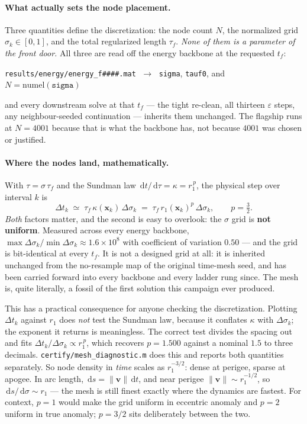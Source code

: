 \documentclass[11pt]{article}
\newcommand{\ud}{\,\mathrm{d}}
\newcommand{\vect}[1]{\bm{#1}}
\newcommand{\file}[1]{\texttt{#1}}
\begin{document}
\paragraph{What actually sets the node placement.} Three quantities define the
discretization: the node count $N$, the normalized grid
$\sigma_k \in [0,1]$, and the total regularized length $\tau_f$. \emph{None of
them is a parameter of the front door.} All three are read off the energy
backbone at the requested $t_f$:
\begin{center}
\file{results/energy/energy\_f\#\#\#\#.mat} $\;\longrightarrow\;$
\texttt{sigma}, \texttt{tauf0}, and $N=\mathrm{numel}(\texttt{sigma})$
\end{center}
and every downstream solve at that $t_f$ --- the tight re-clean, all thirteen
$\varepsilon$ steps, any neighbour-seeded continuation --- inherits them
unchanged. The flagship runs at $N=4001$ because that is what the backbone has,
not because $4001$ was chosen or justified.

\paragraph{Where the nodes land, mathematically.} With $\tau = \sigma\,\tau_f$
and the Sundman law $\ud t/\ud\tau = \kappa = r_1^{\,p}$, the physical step over
interval $k$ is
\begin{equation}
\Delta t_k \;\simeq\; \tau_f\,\kappa(\vect{x}_k)\,\Delta\sigma_k
\;=\; \tau_f\, r_1(\vect{x}_k)^{p}\,\Delta\sigma_k ,
\qquad p = \tfrac{3}{2}.
\label{eq:dtk}
\end{equation}
\emph{Both} factors matter, and the second is easy to overlook: the $\sigma$
grid is \textbf{not uniform}. Measured across every energy backbone,
$\max\Delta\sigma_k / \min\Delta\sigma_k \approx 1.6\times10^{8}$ with
coefficient of variation $0.50$ --- and the grid is bit-identical at every
$t_f$. It is not a designed grid at all: it is inherited unchanged from the
no-resample map of the original time-mesh seed, and has been carried forward
into every backbone and every ladder rung since. The mesh is, quite literally,
a fossil of the first solution this campaign ever produced.

This has a practical consequence for anyone checking the discretization.
Plotting $\Delta t_k$ against $r_1$ does \emph{not} test the Sundman law,
because it conflates $\kappa$ with $\Delta\sigma_k$; the exponent it returns is
meaningless. The correct test divides the spacing out and fits
$\Delta t_k/\Delta\sigma_k \propto r_1^{\,p}$, which recovers $p = 1.500$ against
a nominal $1.5$ to three decimals. \file{certify/mesh\_diagnostic.m} does this
and reports both quantities separately.
So node density in \emph{time} scales as $r_1^{-3/2}$: dense at perigee, sparse
at apogee. In arc length, $\ud s = \|\vect{v}\|\ud t$, and near perigee
$\|\vect{v}\|\sim r_1^{-1/2}$, so $\ud s/\ud\sigma \sim r_1$ --- the mesh is
still finest exactly where the dynamics are fastest. For context, $p=1$ would
make the grid uniform in eccentric anomaly and $p=2$ uniform in true anomaly;
$p=3/2$ sits deliberately between the two.
\end{document}
